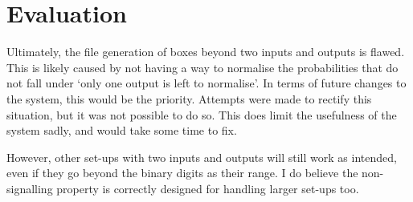 \documentclass[report.tex]{subfiles}
\begin{document}
\section{Evaluation} %
\label{sec:evaluation}
Ultimately, the file generation of boxes beyond two inputs and outputs is
flawed. This is likely caused by not having a way to normalise the probabilities
that do not fall under `only one output is left to normalise'. In terms of
future changes to the system, this would be the priority. Attempts were made to 
rectify this situation, but it was not possible to do so. This does limit the
usefulness of the system sadly, and would take some time to fix.

However, other set-ups with two inputs and outputs will still work as intended,
even if they go beyond the binary digits as their range. I do believe the
non-signalling property is correctly designed for handling larger set-ups too.

\newpage
\end{document}

